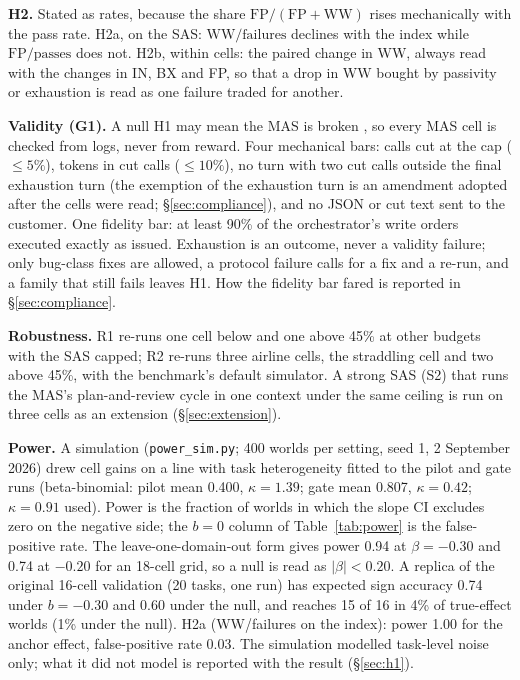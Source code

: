 \textbf{H2.} Stated as rates, because the share $\text{FP}/(\text{FP}+\text{WW})$ rises mechanically with the pass rate. H2a, on the SAS: $\text{WW}/\text{failures}$ declines with the index while $\text{FP}/\text{passes}$ does not. H2b, within cells: the paired change in WW, always read with the changes in IN, BX and FP, so that a drop in WW bought by passivity or exhaustion is read as one failure traded for another.

\textbf{Validity (G1).} A null H1 may mean the MAS is broken \citep{cemri2025mast}, so every MAS cell is checked from logs, never from reward. Four mechanical bars: calls cut at the cap ($\le 5\%$), tokens in cut calls ($\le 10\%$), no turn with two cut calls outside the final exhaustion turn (the exemption of the exhaustion turn is an amendment adopted after the cells were read; \S\ref{sec:compliance}), and no JSON or cut text sent to the customer. One fidelity bar: at least 90\% of the orchestrator's write orders executed exactly as issued. Exhaustion is an outcome, never a validity failure; only bug-class fixes are allowed, a protocol failure calls for a fix and a re-run, and a family that still fails leaves H1. How the fidelity bar fared is reported in \S\ref{sec:compliance}.

\textbf{Robustness.} R1 re-runs one cell below and one above 45\% at other budgets with the SAS capped; R2 re-runs three airline cells, the straddling cell and two above 45\%, with the benchmark's default simulator. A strong SAS (S2) that runs the MAS's plan-and-review cycle in one context under the same ceiling is run on three cells as an extension (\S\ref{sec:extension}).

\textbf{Power.} A simulation (\texttt{power\_sim.py}; 400 worlds per setting, seed 1, 2 September 2026) drew cell gains on a line with task heterogeneity fitted to the pilot and gate runs (beta-binomial: pilot mean 0.400, $\kappa = 1.39$; gate mean 0.807, $\kappa = 0.42$; $\kappa = 0.91$ used). Power is the fraction of worlds in which the slope CI excludes zero on the negative side; the $b = 0$ column of Table~\ref{tab:power} is the false-positive rate. The leave-one-domain-out form gives power 0.94 at $\beta=-0.30$ and 0.74 at $-0.20$ for an 18-cell grid, so a null is read as $|\beta|<0.20$. A replica of the original 16-cell validation (20 tasks, one run) has expected sign accuracy 0.74 under $b = -0.30$ and 0.60 under the null, and reaches 15 of 16 in 4\% of true-effect worlds (1\% under the null). H2a (WW/failures on the index): power 1.00 for the anchor effect, false-positive rate 0.03. The simulation modelled task-level noise only; what it did not model is reported with the result (\S\ref{sec:h1}).

